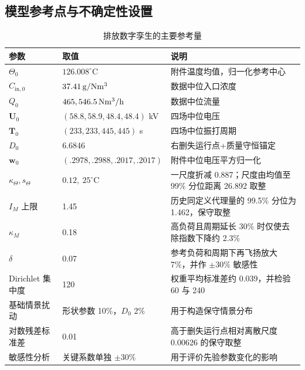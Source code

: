 \subsection{模型参考点与不确定性设置}

\begin{table}[H]
\centering
\caption{排放数字孪生的主要参考量}
\label{tab:priors}
\begin{tabularx}{0.98\textwidth}{C{2.8cm}C{4.6cm}L}
\toprule
参数 & 取值 & 说明\\
\midrule
$\Theta_0$ & $126.008^\circ\mathrm C$ & 附件温度均值，归一化参考中心\\
$C_{\mathrm{in},0}$ & $37.41\,\mathrm{g/Nm^3}$ & 数据中位入口浓度\\
$Q_0$ & $465,546.5\,\mathrm{Nm^3/h}$ & 数据中位流量\\
$\bm U_0$ & $(58.8,58.9,48.4,48.4)$ kV & 四场中位电压\\
$\bm T_0$ & $(233,233,445,445)$ s & 四场中位振打周期\\
$D_0$ & 6.6846 & 右删失运行点+质量守恒锚定\\
$\bm w_0$ & $(.2978,.2988,.2017,.2017)$ & 附件中位电压平方归一化\\
$\kappa_\Theta,s_\Theta$ & $0.12,\ 25^\circ\mathrm C$ & 一尺度折减 0.887；尺度由均值至 99\% 分位距离 26.892 取整\\
$I_M$ 上限 & 1.45 & 历史同定义代理量的 99.5\% 分位为 1.462，保守取整\\
$\kappa_M$ & 0.18 & 高负荷且周期延长 30\% 时仅使去除指数下降约 2.3\%\\
$\delta$ & 0.07 & 参考负荷和周期下再飞扬放大 7\%，并作 $\pm30\%$ 敏感性\\
Dirichlet 集中度 & 120 & 权重平均标准差约 0.039，并检验 60 与 240\\
基础情景扰动 & 形状参数 10\%，$D_0$ 2\% & 用于构造保守情景分布\\
对数残差标准差 & 0.01 & 高于删失运行点相对离散尺度 0.00626 的保守取整\\
敏感性分析 & 关键系数单独 $\pm30\%$ & 用于评价先验参数变化的影响\\
\bottomrule
\end{tabularx}
\end{table}

